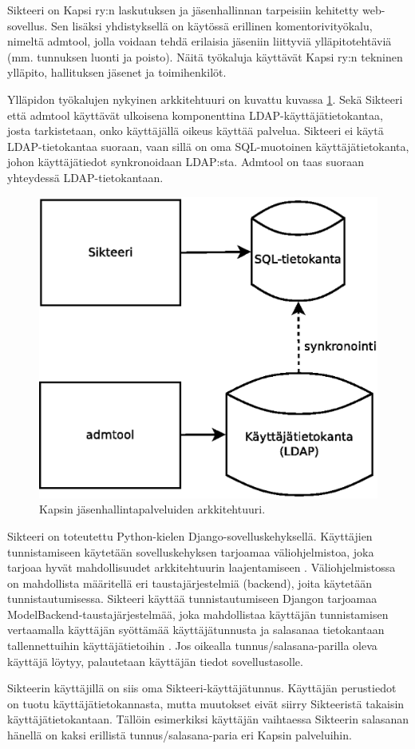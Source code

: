 Sikteeri on Kapsi ry:n laskutuksen ja jäsenhallinnan tarpeisiin kehitetty web-sovellus. Sen lisäksi yhdistyksellä on käytössä erillinen komentorivityökalu, nimeltä admtool, jolla voidaan tehdä erilaisia jäseniin liittyviä ylläpitotehtäviä (mm. tunnuksen luonti ja poisto). Näitä työkaluja käyttävät Kapsi ry:n tekninen ylläpito, hallituksen jäsenet ja toimihenkilöt.

Ylläpidon työkalujen nykyinen arkkitehtuuri on kuvattu kuvassa \ref{kapsi_nykyinen}. Sekä Sikteeri että admtool käyttävät ulkoisena komponenttina LDAP-käyt\-tä\-jä\-tie\-to\-kan\-taa, josta tarkistetaan, onko käyttäjällä oikeus käyttää palvelua. Sikteeri ei käytä LDAP-tietokantaa suoraan, vaan sillä on oma SQL-muotoinen käyttäjätietokanta, johon käyttäjätiedot synkronoidaan LDAP:sta. Admtool on taas suoraan yhteydessä LDAP-tietokantaan.

\begin{figure}[h]
\centering
\includegraphics[width=.7\textwidth]{toteutus/kapsi_nykyinen.eps}
\caption{Kapsin jäsenhallintapalveluiden arkkitehtuuri.}%
\label{kapsi_nykyinen}
\end{figure}

Sikteeri on toteutettu Python-kielen Django-so\-vel\-lus\-ke\-hyk\-sel\-lä. Käyttäjien tunnistamiseen käytetään sovelluskehyksen tarjoamaa vä\-li\-oh\-jel\-mis\-to\-a, joka tarjoaa hyvät mahdollisuudet arkkitehtuurin laajentamiseen \cite{django_auth}. Väliohjelmistossa on mahdollista määritellä eri taustajärjestelmiä (backend), joita käytetään tunnistautumisessa. Sikteeri käyttää tunnistautumiseen Djangon tarjoamaa ModelBackend-taus\-ta\-jär\-jes\-tel\-mää, joka mahdollistaa käyttäjän tunnistamisen vertaamalla käyttäjän syöttämää käyttäjätunnusta ja salasanaa tietokantaan tallennettuihin käyttäjätietoihin \cite{django_auth}. Jos oikealla tunnus/salasana-parilla oleva käyttäjä löytyy, palautetaan käyttäjän tiedot sovellustasolle.

Sikteerin käyttäjillä on siis oma Sikteeri-käyttäjätunnus. Käyttäjän perustiedot on tuotu käyttäjätietokannasta, mutta muutokset eivät siirry Sikteeristä takaisin käyttäjätietokantaan. Tällöin esimerkiksi käyttäjän vaihtaessa Sikteerin salasanan hänellä on kaksi erillistä tunnus/salasana-paria eri Kapsin palveluihin.